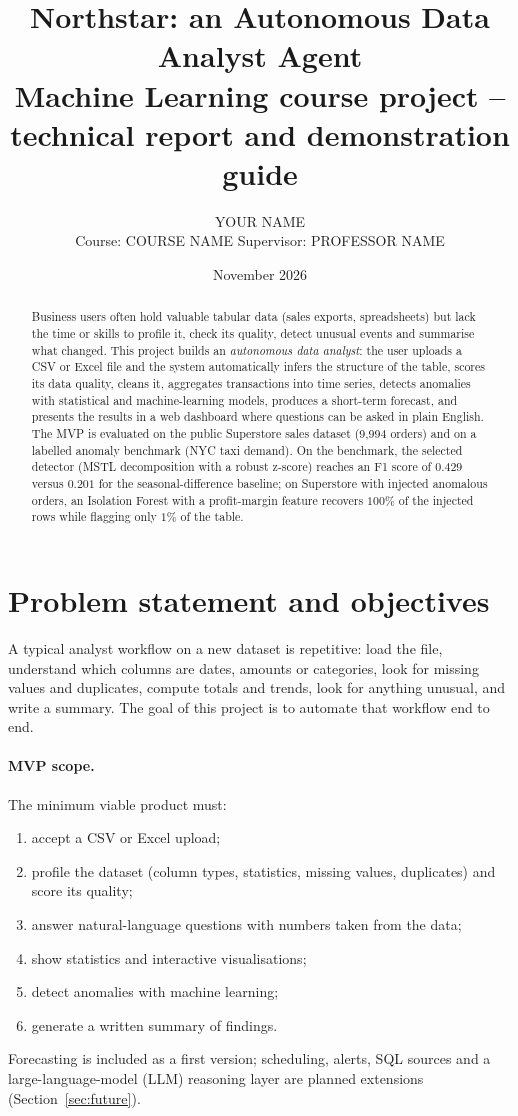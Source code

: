 \documentclass[11pt,a4paper]{article}
\title{\textbf{Northstar: an Autonomous Data Analyst Agent}\\[4pt]
\large Machine Learning course project -- technical report and demonstration guide}
\author{YOUR NAME\\ \small Course: COURSE NAME \quad Supervisor: PROFESSOR NAME}
\date{November 2026}
\begin{document}
\maketitle

\begin{abstract}
\noindent
Business users often hold valuable tabular data (sales exports, spreadsheets) but lack the time or skills to
profile it, check its quality, detect unusual events and summarise what changed. This project builds an
\emph{autonomous data analyst}: the user uploads a CSV or Excel file and the system automatically infers the
structure of the table, scores its data quality, cleans it, aggregates transactions into time series, detects
anomalies with statistical and machine-learning models, produces a short-term forecast, and presents the results
in a web dashboard where questions can be asked in plain English. The MVP is evaluated on the public
Superstore sales dataset (9{,}994 orders) and on a labelled anomaly benchmark (NYC taxi demand). On the
benchmark, the selected detector (MSTL decomposition with a robust z-score) reaches an F1 score of $0.429$ versus
$0.201$ for the seasonal-difference baseline; on Superstore with injected anomalous orders, an Isolation Forest with
a profit-margin feature recovers $100\%$ of the injected rows while flagging only $1\%$ of the table.
\end{abstract}

\tableofcontents
\newpage

\section{Problem statement and objectives}

A typical analyst workflow on a new dataset is repetitive: load the file, understand which columns are dates,
amounts or categories, look for missing values and duplicates, compute totals and trends, look for anything
unusual, and write a summary. The goal of this project is to automate that workflow end to end.

\paragraph{MVP scope.} The minimum viable product must:
\begin{enumerate}
  \item accept a CSV or Excel upload;
  \item profile the dataset (column types, statistics, missing values, duplicates) and score its quality;
  \item answer natural-language questions with numbers taken from the data;
  \item show statistics and interactive visualisations;
  \item detect anomalies with machine learning;
  \item generate a written summary of findings.
\end{enumerate}
Forecasting is included as a first version; scheduling, alerts, SQL sources and a large-language-model (LLM)
reasoning layer are planned extensions (Section~\ref{sec:future}).
\end{document}
